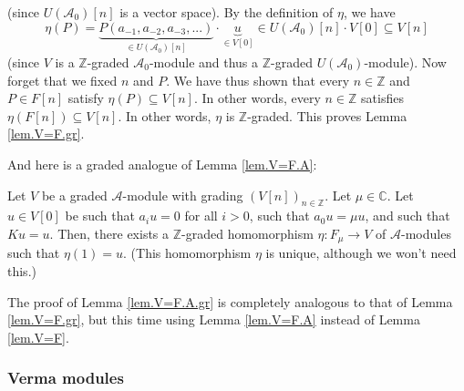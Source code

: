\documentclass[etingof-lie.tex]{subfiles}
\begin{document}
(since $U\left(  \mathcal{A}_{0}\right)  \left[  n\right]  $ is a vector
space). By the definition of $\eta$, we have%
\[
\eta\left(  P\right)  =\underbrace{P\left(  a_{-1},a_{-2},a_{-3},...\right)
}_{\in U\left(  \mathcal{A}_{0}\right)  \left[  n\right]  }\cdot
\underbrace{u}_{\in V\left[  0\right]  }\in U\left(  \mathcal{A}_{0}\right)
\left[  n\right]  \cdot V\left[  0\right]  \subseteq V\left[  n\right]
\]
(since $V$ is a $\mathbb{Z}$-graded $\mathcal{A}_{0}$-module and thus a
$\mathbb{Z}$-graded $U\left(  \mathcal{A}_{0}\right)  $-module). Now forget
that we fixed $n$ and $P$. We have thus shown that every $n\in\mathbb{Z}$ and
$P\in F\left[  n\right]  $ satisfy $\eta\left(  P\right)  \subseteq V\left[
n\right]  $. In other words, every $n\in\mathbb{Z}$ satisfies $\eta\left(
F\left[  n\right]  \right)  \subseteq V\left[  n\right]  $. In other words,
$\eta$ is $\mathbb{Z}$-graded. This proves Lemma \ref{lem.V=F.gr}.

And here is a graded analogue of Lemma \ref{lem.V=F.A}:

\begin{lemma}
\label{lem.V=F.A.gr}Let $V$ be a graded $\mathcal{A}$-module with grading
$\left(  V\left[  n\right]  \right)  _{n\in\mathbb{Z}}$. Let $\mu\in
\mathbb{C}$. Let $u\in V\left[  0\right]  $ be such that $a_{i}u=0$ for all
$i>0$, such that $a_{0}u=\mu u$, and such that $Ku=u$. Then, there exists a
$\mathbb{Z}$-graded homomorphism $\eta:F_{\mu}\rightarrow V$ of $\mathcal{A}%
$-modules such that $\eta\left(  1\right)  =u$. (This homomorphism $\eta$ is
unique, although we won't need this.)
\end{lemma}

The proof of Lemma \ref{lem.V=F.A.gr} is completely analogous to that of Lemma
\ref{lem.V=F.gr}, but this time using Lemma \ref{lem.V=F.A} instead of Lemma
\ref{lem.V=F}.

\subsubsection{Verma modules}
\end{document}
